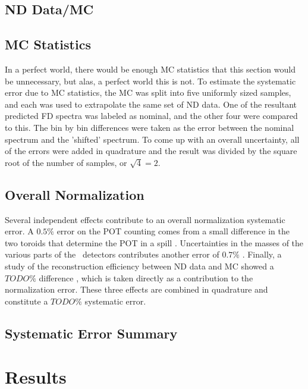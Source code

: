 \subsection{ND Data/MC}

\subsection{MC Statistics}

In a perfect world, there would be enough MC statistics that this section would be unnecessary, but alas, a perfect world this is not. To estimate the systematic error due to MC statistics, the MC was split into five uniformly sized samples, and each was used to extrapolate the same set of ND data. One of the resultant predicted FD spectra was labeled as nominal, and the other four were compared to this. The bin by bin differences were taken as the error between the nominal spectrum and the 'shifted' spectrum. To come up with an overall uncertainty, all of the errors were added in quadrature and the result was divided by the square root of the number of samples, or $\sqrt{4} = 2$.

\subsection{Overall Normalization}

Several independent effects contribute to an overall normalization systematic error. A $0.5\%$ error on the POT counting comes from a small difference in the two toroids that determine the POT in a spill \cite{ref:TNBeam}. Uncertainties in the masses of the various parts of the \nova~detectors contributes another error of $0.7\%$ \cite{ref:MassError}. Finally, a study of the reconstruction efficiency between ND data and MC showed a $TODO\%$ difference \cite{ref:NDDataMCRecoEff}, which is taken directly as a contribution to the normalization error. These three effects are combined in quadrature and constitute a $TODO\%$ systematic error.

\subsection{Systematic Error Summary}

\section{Results}
